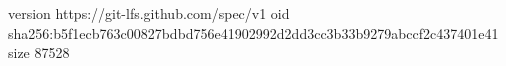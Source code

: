 version https://git-lfs.github.com/spec/v1
oid sha256:b5f1ecb763c00827bdbd756e41902992d2dd3cc3b33b9279abccf2c437401e41
size 87528
